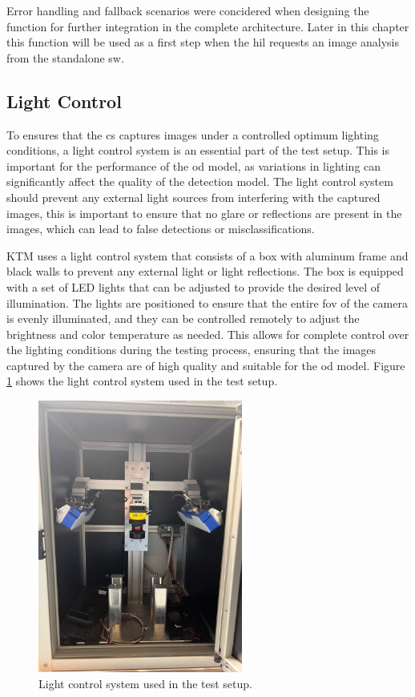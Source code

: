 Error handling and fallback scenarios were concidered when designing the function for further integration in the complete architecture. Later in this chapter this function will be used as a first step when the \gls{hil} requests an image analysis from the standalone \gls{sw}.







\subsection{Light Control}
To ensures that the \gls{cs} captures images under a controlled optimum lighting conditions, a light control system is an essential part of the test setup. This is important for the performance of the \gls{od} model, as variations in lighting can significantly affect the quality of the detection model. The light control system should prevent any external light sources from interfering with the captured images, this is important to ensure that no glare or reflections are present in the images, which can lead to false detections or misclassifications.

KTM uses a light control system that consists of a box with aluminum frame and black walls to prevent any external light or light reflections. The box is equipped with a set of LED lights that can be adjusted to provide the desired level of illumination. The lights are positioned to ensure that the entire \gls{fov} of the camera is evenly illuminated, and they can be controlled remotely to adjust the brightness and color temperature as needed. This allows for complete control over the lighting conditions during the testing process, ensuring that the images captured by the camera are of high quality and suitable for the \gls{od} model. Figure \ref{LightControl} shows the light control system used in the test setup.

\begin{figure}[!htb]
    \centering
    \includegraphics[width=0.6\textwidth]{Figures/Light_Control_Box.jpg}
    \caption{Light control system used in the test setup.}
    \label{LightControl}
\end{figure}

